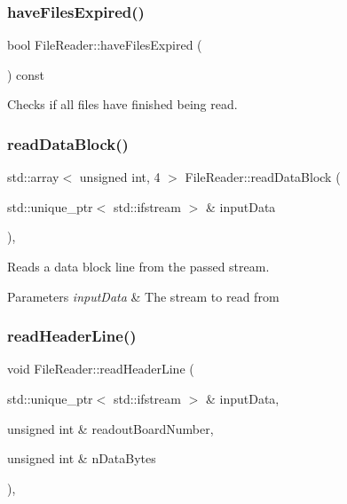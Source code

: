 \subsubsection{\texorpdfstring{have\+Files\+Expired()}{haveFilesExpired()}}
{\footnotesize\ttfamily bool File\+Reader\+::have\+Files\+Expired (\begin{DoxyParamCaption}{ }\end{DoxyParamCaption}) const\hspace{0.3cm}{\ttfamily [inline]}}



Checks if all files have finished being read. 

\mbox{\label{class_file_reader_ac578b683eba751027766a2c30f03a28b}} 
\subsubsection{\texorpdfstring{read\+Data\+Block()}{readDataBlock()}}
{\footnotesize\ttfamily std\+::array$<$ unsigned int, 4 $>$ File\+Reader\+::read\+Data\+Block (\begin{DoxyParamCaption}\item[{std\+::unique\+\_\+ptr$<$ std\+::ifstream $>$ \&}]{input\+Data }\end{DoxyParamCaption})\hspace{0.3cm}{\ttfamily [inline]}, {\ttfamily [private]}}



Reads a data block line from the passed stream. 


\begin{DoxyParams}{Parameters}
{\em input\+Data} & The stream to read from \\
\hline
\end{DoxyParams}
\mbox{\label{class_file_reader_a94a71d0a05ececd1e84fa71d80b7e6ba}} 
\subsubsection{\texorpdfstring{read\+Header\+Line()}{readHeaderLine()}}
{\footnotesize\ttfamily void File\+Reader\+::read\+Header\+Line (\begin{DoxyParamCaption}\item[{std\+::unique\+\_\+ptr$<$ std\+::ifstream $>$ \&}]{input\+Data,  }\item[{unsigned int \&}]{readout\+Board\+Number,  }\item[{unsigned int \&}]{n\+Data\+Bytes }\end{DoxyParamCaption})\hspace{0.3cm}{\ttfamily [inline]}, {\ttfamily [private]}}



